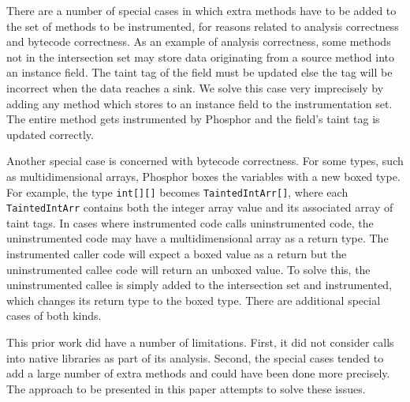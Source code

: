 There are a number of special cases in which extra methods have to be added to the set of methods to be instrumented, for reasons related to analysis correctness and bytecode correctness. As an example of analysis correctness, some methods not in the intersection set may store data originating from a source method into an instance field. The taint tag of the field must be updated else the tag will be incorrect when the data reaches a sink. We solve this case very imprecisely by adding any method which stores to an instance field to the instrumentation set. The entire method gets instrumented by Phosphor and the field's taint tag is updated correctly.

Another special case is concerned with bytecode correctness. For some types, such as multidimensional arrays, Phosphor boxes the variables with a new boxed type. For example, the type \texttt{int[][]} becomes \texttt{TaintedIntArr[]}, where each \texttt{TaintedIntArr} contains both the integer array value and its associated array of taint tags. In cases where instrumented code calls uninstrumented code, the uninstrumented code may have a multidimensional array as a return type. The instrumented caller code will expect a boxed value as a return but the uninstrumented callee code will return an unboxed value. To solve this, the uninstrumented callee is simply added to the intersection set and instrumented, which changes its return type to the boxed type. There are additional special cases of both kinds.

This prior work did have a number of limitations. First, it did not consider calls into native libraries as part of its analysis. Second, the special cases tended to add a large number of extra methods and could have been done more precisely. The approach to be presented in this paper attempts to solve these issues.

